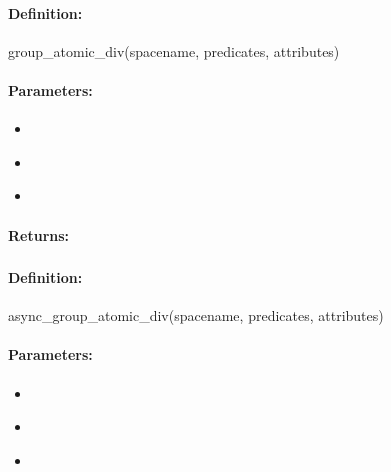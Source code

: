 \paragraph{Definition:}
\begin{rubycode}
group_atomic_div(spacename, predicates, attributes)
\end{rubycode}

\paragraph{Parameters:}
\begin{itemize}[noitemsep]
\item {}\\

\item {}\\

\item {}\\

\end{itemize}

\paragraph{Returns:}


\pagebreak
\subsubsection{}
\label{api:ruby:async_group_atomic_div}


\paragraph{Definition:}
\begin{rubycode}
async_group_atomic_div(spacename, predicates, attributes)
\end{rubycode}

\paragraph{Parameters:}
\begin{itemize}[noitemsep]
\item {}\\

\item {}\\

\item {}\\

\end{itemize}

